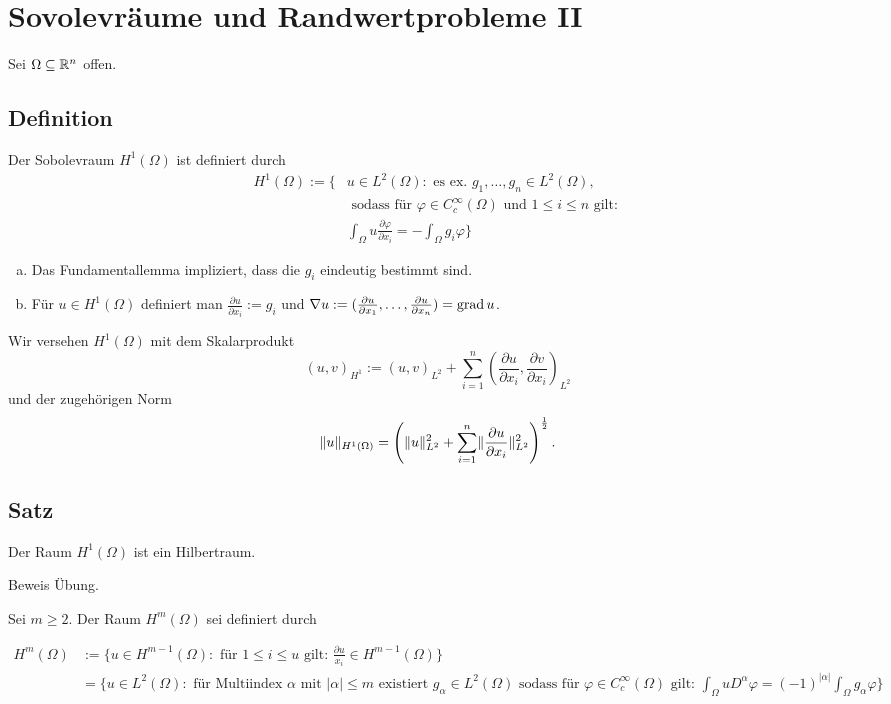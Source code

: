 \section{Sovolevräume und Randwertprobleme II}

Sei $\Omega \subseteq \mathbb{R}^n$ offen.

\subsection{Definition}

Der Sobolevraum $H^1(\Omega)$ ist definiert durch
\begin{align*}
H^1(\Omega) := \{&u \in L^2(\Omega) \colon \text{ es ex. } g_1, \dots, g_n \in L^2(\Omega), \\
                 &\text{ sodass für } \varphi \in C_c^\infty(\Omega) \text{ und } 1 \leq i \leq n \text{ gilt: } \\
                 & \int_\Omega u \frac{\partial \varphi}{\partial x_i} = - \int_\Omega g_i \varphi \}
\end{align*}

\begin{bem}
  \begin{enumerate}[a)]
  \item Das Fundamentallemma impliziert, dass die $g_i$ eindeutig bestimmt sind.
  \item Für $u \in H^1(\Omega)$ definiert man $\frac{\partial u}{\partial x_i} := g_i$ und $\nabla u := ( \frac{\partial u}{\partial x_1}, \dots, \frac{\partial u}{\partial x_n}) = \operatorname{grad} u$.
\end{enumerate}
\end{bem}

Wir versehen $H^1(\Omega)$ mit dem Skalarprodukt
$$
(u,v)_{H^1} := (u,v)_{L^2} + \sum_{i = 1}^n (\frac{\partial u}{\partial x_i}, \frac{\partial v}{\partial x_i})_{L^2}
$$
und der zugehörigen Norm
$$
\lVert u \rVert_{H^1(\Omega)} = \left(\lVert u \rVert_{L^2}^2 + \sum_{i = 1}^n \lVert \frac{\partial u}{\partial x_i} \rVert_{L^2}^2 \right)^{\frac{1}{2}}.
$$

\subsection{Satz}

Der Raum $H^1(\Omega)$ ist ein Hilbertraum.

Beweis Übung.

Sei $m \geq 2$. Der Raum $H^m(\Omega)$ sei definiert durch

\begin{align*}
H^m(\Omega) 
&:=  \{ u \in H^{m - 1}(\Omega) \colon \text{ für } 1 \leq i \leq u \text{ gilt: } \frac{\partial u}{x_i} \in H^{m-1}(\Omega) \} \\
& = \{u \in L^2(\Omega) \colon \text{ für Multiindex } \alpha \text{ mit } |\alpha| \leq m \text{ existiert } g_\alpha \in L^2(\Omega) \text{ sodass für } \varphi \in C_c^\infty(\Omega) \text{ gilt: } \int_\Omega u D^\alpha \varphi = (-1)^{|\alpha|} \int_\Omega g_\alpha \varphi \}
\end{align*}

